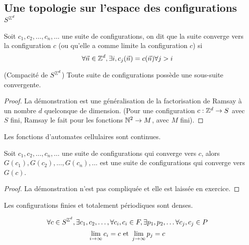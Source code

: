 \subsection{Une topologie sur l'espace des configurations $S^{\mathbb{Z}^d}$}


\begin{definition}
	Soit $c_1,c_2, \ldots, c_n, \ldots$ une suite de configurations, on dit que la suite converge vers
	la configuration $c$ (ou qu'elle a comme limite la configuration $c$) si
	$$ \forall \vec n \in \mathbb{Z}^d, \exists i, c_j(\vec n) = c(\vec n) \forall j > i$$
\end{definition}

\begin{prop}(Compacité de $S^{\mathbb{Z}^d}$)
	Toute suite de configurations possède une sous-suite convergente.
\end{prop}

\begin{proof}
	La démonstration est une généralisation de la factorisation de Ramsay à un nombre $d$ quelconque de dimension.
	(Pour une configuration $c : \mathbb{Z}^d \to S$ avec $S$ fini, Ramsay le fait pour les fonctions $\mathbb{N} ^ 2 \to M$, avec $M$ fini).
\end{proof}

\begin{prop}\label{prop:continues}
	Les fonctions d'automates cellulaires sont continues.
	
	Soit $c_1,c_2, \ldots, c_n, \ldots$ une suite de configurations qui converge vers $c$,
	alors $G(c_1),G(c_2), \ldots, G(c_n), \ldots$ est une suite de configurations qui converge vers $G(c)$.
\end{prop}

\begin{proof}
	La démonstration n'est pas compliquée et elle est laissée en exercice.
\end{proof}

\begin{prop}\label{prop:dense}
	Les configurations finies et totalement périodiques sont denses.

	$$\forall c \in S^{\mathbb{Z}^d}, \exists c_1,c_2, \ldots,\forall c_i, c_i \in F, \exists p_1,p_2, \ldots \forall c_j, c_j \in P$$
	$$ \lim_{i \to \infty} c_i = c \text{ et } \lim_{j \to \infty} p_j = c $$
\end{prop}

